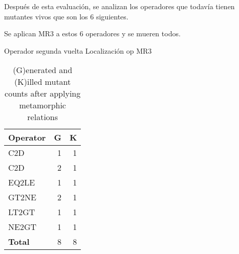 Después de esta evaluación, se analizan los operadores que todavía tienen mutantes vivos que son los 6 siguientes.

Se aplican MR3 a estos 6 operadores y se mueren todos.

Operador segunda vuelta	Localización op	MR3


\begin{table}
    \centering
    \begin{tabular}{lrr}
    \toprule
    \textbf{Operator} & \textbf{G} &  \textbf{K} \\
    \midrule
C2D 	& 1	& 1 \\ 
C2D	    & 2	& 1 \\
EQ2LE	& 1	& 1 \\
GT2NE	& 2	& 1 \\
LT2GT	& 1	& 1 \\
NE2GT	& 1	& 1 \\

    \midrule
    \textbf{Total} & 8 & 8  \\
    \bottomrule
    \end{tabular}
    \caption{(G)enerated and (K)illed mutant counts after applying metamorphic relations}
    \label{tab:mutant-counts2}
\end{table}